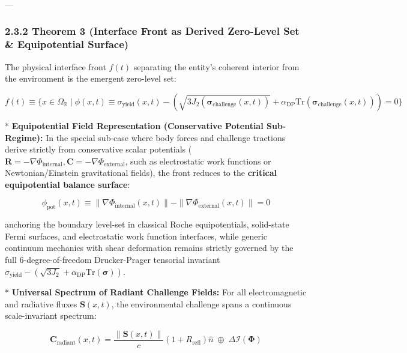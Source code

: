 \documentclass[11pt,a4paper]{article}
\theoremstyle{definition}
\theoremstyle{remark}
\begin{document}
---

\subsubsection{2.3.2 Theorem 3 (Interface Front as Derived Zero-Level Set \& Equipotential Surface)}
The physical interface front $f(t)$ separating the entity's coherent interior from the environment is the emergent zero-level set:


\begin{equation}
\boxed{f(t) \equiv \{ x \in \Omega_{\mathbb{R}} \;\Big|\; \phi(x, t) \equiv \sigma_{\text{yield}}(x, t) - \left( \sqrt{3 J_2\left(\boldsymbol{\sigma}_{\text{challenge}}(x, t)\right)} + \alpha_{\text{DP}} \mathrm{Tr} \left(\boldsymbol{\sigma}_{\text{challenge}}(x, t)\right) \right) = 0 \}}
\end{equation}


* \textbf{Equipotential Field Representation (Conservative Potential Sub-Regime):} In the special sub-case where body forces and challenge tractions derive strictly from conservative scalar potentials ( $\mathbf{R} = -\nabla \Phi_{\text{internal}}, \mathbf{C} = -\nabla \Phi_{\text{external}}$, such as electrostatic work functions or Newtonian/Einstein gravitational fields), the front reduces to the \textbf{critical equipotential balance surface}:


\begin{equation}
\boxed{\phi_{\text{pot}}(x, t) \equiv \|\nabla \Phi_{\text{internal}}(x, t)\| - \|\nabla \Phi_{\text{external}}(x, t)\| = 0}
\end{equation}


anchoring the boundary level-set in classical Roche equipotentials, solid-state Fermi surfaces, and electrostatic work function interfaces, while generic continuum mechanics with shear deformation remains strictly governed by the full 6-degree-of-freedom Drucker-Prager tensorial invariant $\sigma_{\text{yield}} - (\sqrt{3 J_2} + \alpha_{\text{DP}}\mathrm{Tr}(\boldsymbol{\sigma}))$.

* \textbf{Universal Spectrum of Radiant Challenge Fields:}
For all electromagnetic and radiative fluxes $\mathbf{S}(x, t)$, the environmental challenge spans a continuous scale-invariant spectrum:


\begin{equation}
\mathbf{C}_{\text{radiant}}(x, t) = \frac{\|\mathbf{S}(x, t)\|}{c}(1 + R_{\text{refl}})\hat{n} \;\oplus\; \Delta \mathcal{I}(\mathbf{\Phi})
\end{equation}
\end{document}
